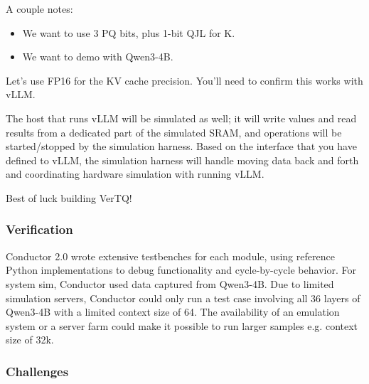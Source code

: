 \begin{tcolorbox}[
	colback=white,
	colframe=black,
	coltext=vrkblue,
	breakable,
	fontupper=\scriptsize\fontfamily{pcr}\selectfont,
	before upper={\RaggedRight}
	]
	A couple notes:
	\begin{itemize}
		\item We want to use 3 PQ bits, plus 1-bit QJL for K.
		\item We want to demo with Qwen3-4B.
	\end{itemize}
	
	Let's use FP16 for the KV cache precision. You'll need to confirm this works with vLLM.
	
	\smallskip
	
	The host that runs vLLM will be simulated as well; it will write values and read results from a dedicated part of the simulated SRAM, and operations will be started/stopped by the simulation harness. Based on the interface that you have defined to vLLM, the simulation harness will handle moving data back and forth and coordinating hardware simulation with running vLLM.
	
	\smallskip
	
	Best of luck building VerTQ!
\end{tcolorbox}

\subsubsection{Verification}

Conductor 2.0 wrote extensive testbenches for each module, using reference Python implementations to debug functionality and cycle-by-cycle behavior. For system sim, Conductor used data captured from Qwen3-4B. Due to limited simulation servers, Conductor could only run a test case involving all 36 layers of Qwen3-4B with a limited context size of 64. The availability of an emulation system or a server farm could make it possible to run larger samples e.g. context size of 32k.

\subsubsection{Challenges}

